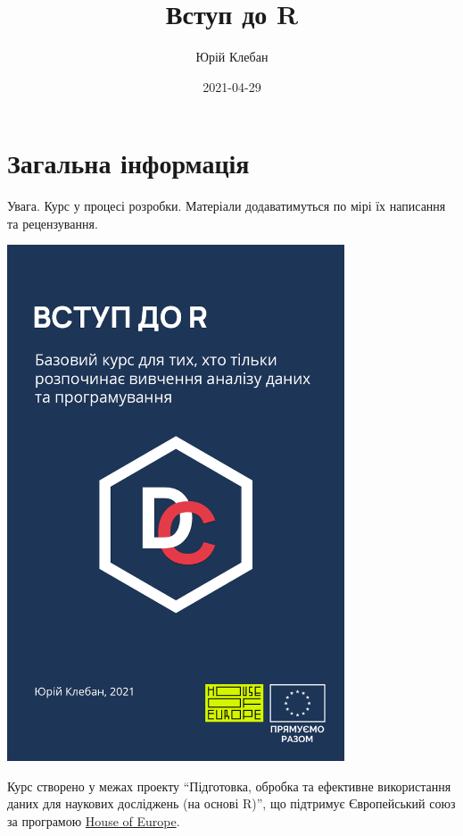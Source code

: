 \documentclass[
]{book}
\title{Вступ до R}
\author{Юрій Клебан}
\date{2021-04-29}
\begin{document}
\maketitle

{
\setcounter{tocdepth}{1}
\tableofcontents
}
\hypertarget{ux437ux430ux433ux430ux43bux44cux43dux430-ux456ux43dux444ux43eux440ux43cux430ux446ux456ux44f}{%
\chapter*{Загальна інформація}\label{ux437ux430ux433ux430ux43bux44cux43dux430-ux456ux43dux444ux43eux440ux43cux430ux446ux456ux44f}}

Увага. Курс у процесі розробки. Матеріали додаватимуться по мірі їх написання та рецензування.

\includegraphics[width=0.75\textwidth,height=\textheight]{images/cover.png}

Курс створено у межах проекту ``Підготовка, обробка та ефективне використання даних для наукових досліджень (на основі R)'', що підтримує Європейський союз за програмою \href{https://houseofeurope.org.ua/}{House of Europe}.
\end{document}
